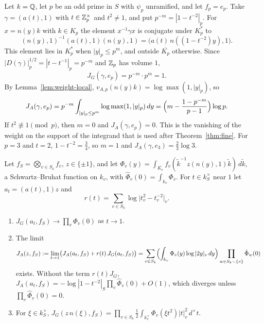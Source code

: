 \begin{example}\label{ex:JA-hyp-p}
Let $k=\mathbb{Q}$, let $p$ be an odd prime in $S$ with $\psi_p$ unramified, and
let $f_p=e_p$. Take $\gamma=(a(t),1)$ with $t\in\mathbb{Z}_p^\times$ and
$t^2\ne1$, and put $p^{-m}=|1-t^{-2}|_p$. For $x=n(y)k$ with $k\in K_p$
the element $x^{-1}\gamma x$ is conjugate under $K_p^*$ to
\[
(n(y),1)^{-1}(a(t),1)(n(y),1)=\bigl(a(t)\,n((1-t^{-2})y),1\bigr).
\]
This element lies in $K_p^*$ when $|y|_p\le p^m$, and outside
$\overline{K_p}$ otherwise. Since $|D(\gamma)|_p^{1/2}=|t-t^{-1}|_p=
p^{-m}$ and $\mathbb{Z}_p$ has volume $1$,
\[
J_G(\gamma,e_p)=p^{-m}\cdot p^m=1.
\]
By Lemma~\ref{lem:weight-local}, $v_{A,p}(n(y)k)=\log\max(1,|y|_p)$, so
\[
J_A(\gamma,e_p)=p^{-m}\int_{|y|_p\le p^m}\log\max(1,|y|_p)\,dy
=\Bigl(m-\frac{1-p^{-m}}{p-1}\Bigr)\log p .
\]
If $t^2\not\equiv1\pmod p$, then $m=0$ and $J_A(\gamma,e_p)=0$. This is
the vanishing of the weight on the support of the integrand that is used
after Theorem~\ref{thm:fine}. For $p=3$ and $t=2$, $1-t^{-2}=\frac34$, so
$m=1$ and $J_A(\gamma,e_3)=\frac23\log3$.
\end{example}

\begin{lemma}\label{lem:JA-central}
Let $f_S=\bigotimes_{v\in S_k}f_v$, $z\in\{\pm1\}$, and let
$\Phi_v(y)=\int_{\overline{K_v}}f_v(\tilde k^{-1}z(n(y),1)\tilde k)\,
d\tilde k$, a Schwartz--Bruhat function on $k_v$, with $\hat\Phi_v(0)=
\int_{k_v}\Phi_v$. For $t\in k_S^\times$ near $1$ let $a_t=(a(t),1)z$
and
\[
r(t)=\sum_{v\in S_k}\log\bigl|t_v^2-t_v^{-2}\bigr|_v .
\]
\begin{enumerate}[label=(\alph*)]
\item $J_G(a_t,f_S)\to\prod_v\hat\Phi_v(0)$ as $t\to1$.
\item The limit
  \[
  J_A(z,f_S):=\lim_{t\to1}\bigl(J_A(a_t,f_S)+r(t)\,J_G(a_t,f_S)\bigr)
  =\sum_{v\in S_k}\Bigl(\int_{k_v}\Phi_v(y)\log|2y|_v\,dy\Bigr)
  \prod_{w\in S_k\smallsetminus\{v\}}\hat\Phi_w(0)
  \]
  exists. Without the term $r(t)J_G$, $J_A(a_t,f_S)=-\log|1-t^{-2}|_S
  \prod_v\hat\Phi_v(0)+O(1)$, which diverges unless
  $\prod_v\hat\Phi_v(0)=0$.
\item For $\xi\in k_S^\times$, $J_G(z\,n(\xi),f_S)=\prod_{v\in S_k}
  \tfrac12\int_{k_v^\times}\Phi_v(\xi t^2)|t|_v^2\,d^\times t$.
\end{enumerate}
\end{lemma}

